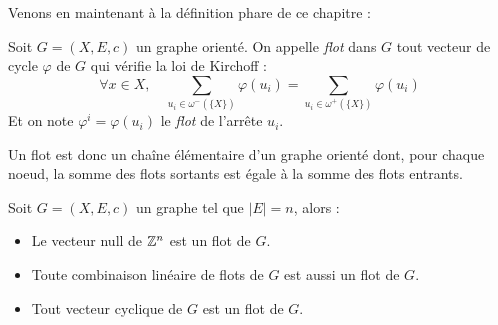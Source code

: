 Venons en maintenant à la définition phare de ce chapitre : 

\begin{definition}[Flot]
    Soit $G = (X, E, c)$ un graphe orienté. On appelle \emph{flot} dans $G$ tout vecteur de 
    cycle $ \varphi$ de $G$ qui vérifie la loi de Kirchoff : 
        $$ \boxed{\forall x \in X, \quad \sum_{ u_i \in \omega^-(\{X\})} \varphi(u_i) = \sum_{u_i \in \omega^+(\{X\})} \varphi(u_i)} $$
    Et on note $ \varphi^i = \varphi(u_i)$ le \emph{flot} de l'arrête $u_i$. 
\end{definition}

\begin{remark}
    Un flot est donc un chaîne élémentaire d'un graphe orienté dont, pour chaque noeud, la somme des flots 
    sortants est égale à la somme des flots entrants. 
\end{remark}

\begin{prop}[Flots]
    Soit $G = (X,E, c)$ un graphe tel que $|E| = n$, alors : 
    \begin{itemize}
        \item Le vecteur null de $\mathbb{Z}^n$ est un flot de $G$. 
        \item Toute combinaison linéaire de flots de $G$ est aussi un flot de $G$. 
        \item Tout vecteur cyclique de $G$ est un flot de $G$. 
    \end{itemize}
\end{prop}


